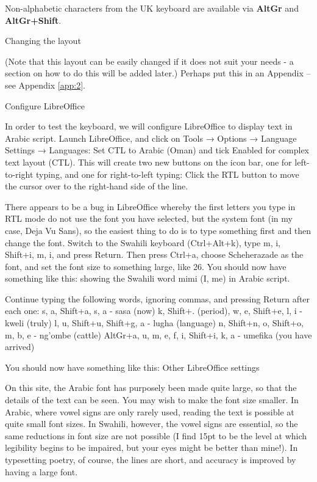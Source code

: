 \documentclass[a4paper,10pt, oneside]{book}
\begin{document}
Non-alphabetic characters from the UK keyboard are available via \textbf{AltGr} and \textbf{AltGr+Shift}.


Changing the layout

(Note that this layout can be easily changed if it does not suit your needs - a section on how to do this will be added later.)
Perhaps put this in an Appendix -- see Appendix \ref{app:2}.

Configure LibreOffice

In order to test the keyboard, we will configure LibreOffice to display text in Arabic script. Launch LibreOffice, and click on Tools → Options → Language Settings → Languages:
Set CTL to Arabic (Oman) and tick Enabled for complex text layout (CTL). This will create two new buttons on the icon bar, one for left-to-right typing, and one for right-to-left typing:
Click the RTL button to move the cursor over to the right-hand side of the line.

There appears to be a bug in LibreOffice whereby the first letters you type in RTL mode do not use the font you have selected, but the system font (in my case, Deja Vu Sans), so the easiest thing to do is to type something first and then change the font. Switch to the Swahili keyboard (Ctrl+Alt+k), type m, i, Shift+i, m, i, and press Return. Then press Ctrl+a, choose Scheherazade as the font, and set the font size to something large, like 26. You should now have something like this:
showing the Swahili word mimi (I, me) in Arabic script.

Continue typing the following words, ignoring commas, and pressing Return after each one:
s, a, Shift+a, s, a - sasa (now)
k, Shift+. (period), w, e, Shift+e, l, i - kweli (truly)
l, u, Shift+u, Shift+g, a - lugha (language)
n, Shift+n, o, Shift+o, m, b, e - ng'ombe (cattle)
AltGr+a, u, m, e, f, i, Shift+i, k, a - umefika (you have arrived)

You should now have something like this:
Other LibreOffice settings

On this site, the Arabic font has purposely been made quite large, so that the details of the text can be seen. You may wish to make the font size smaller. In Arabic, where vowel signs are only rarely used, reading the text is possible at quite small font sizes. In Swahili, however, the vowel signs are essential, so the same reductions in font size are not possible (I find 15pt to be the level at which legibility begins to be impaired, but your eyes might be better than mine!). In typesetting poetry, of course, the lines are short, and accuracy is improved by having a large font.
\end{document}
